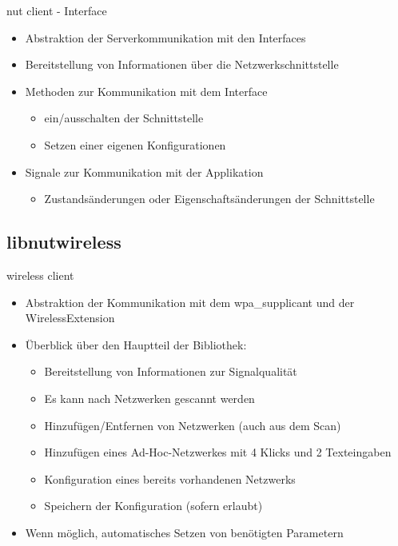 \begin{frame}[<+-| alert@+>]{nut client - Interface}
	\begin{itemize}
		\item Abstraktion der Serverkommunikation mit den Interfaces
		\item Bereitstellung von Informationen über die Netzwerkschnittstelle
		\item Methoden zur Kommunikation mit dem Interface
		\begin{itemize}
			\item ein/ausschalten der Schnittstelle
			\item Setzen einer eigenen Konfigurationen
		\end{itemize}
		\item Signale zur Kommunikation mit der Applikation
		\begin{itemize}
			\item Zustandsänderungen oder Eigenschaftsänderungen der Schnittstelle
		\end{itemize}
	\end{itemize}
\end{frame}

\subsection{libnutwireless}
\begin{frame}[<+-| alert@+>]{wireless client}
	\begin{itemize}
		\item Abstraktion der Kommunikation mit dem wpa\_supplicant und der WirelessExtension
		\item Überblick über den Hauptteil der Bibliothek:
		\begin{itemize}
			\item Bereitstellung von Informationen zur Signalqualität
			\item Es kann nach Netzwerken gescannt werden
			\item Hinzufügen/Entfernen von Netzwerken (auch aus dem Scan)
			\item Hinzufügen eines Ad-Hoc-Netzwerkes mit 4 Klicks und 2 Texteingaben
			\item Konfiguration eines bereits vorhandenen Netzwerks
			\item Speichern der Konfiguration (sofern erlaubt)
		\end{itemize}
		\item Wenn möglich, automatisches Setzen von benötigten Parametern
	\end{itemize}
\end{frame}
